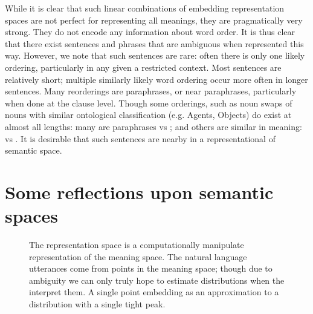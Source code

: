 \documentclass{book}
\begin{document}
While it is clear that such linear combinations of embedding  representation spaces are not perfect for representing all meanings,
they are pragmatically very strong.
They do not encode any information about word order.
It is thus clear that there exist sentences and phrases that are ambiguous when represented this way.
However, we note that such sentences are rare: often there is only one likely ordering, particularly in any given  a restricted context.
Most sentences are relatively short; multiple similarly likely word ordering occur more often in longer sentences.
Many reorderings are paraphrases, or near paraphrases, particularly when done at the clause level.
Though some orderings, such as noun swaps of nouns with similar ontological classification (e.g. Agents, Objects) do exist at almost all lengths:
many are paraphrases  vs ;
and others are similar in meaning:  vs .
It is desirable that such sentences are nearby in a representational of semantic space.

\section{Some reflections upon semantic spaces}
\begin{figure}
	\centering
	\caption{\label{fig:spaces} The representation space is a computationally manipulate representation of the meaning space.
		The natural language utterances come from points in the meaning space; though due to ambiguity we can only truly hope to estimate distributions when the interpret them. A single point embedding as an approximation to a distribution with a single tight peak.}
\end{figure}
\end{document}
